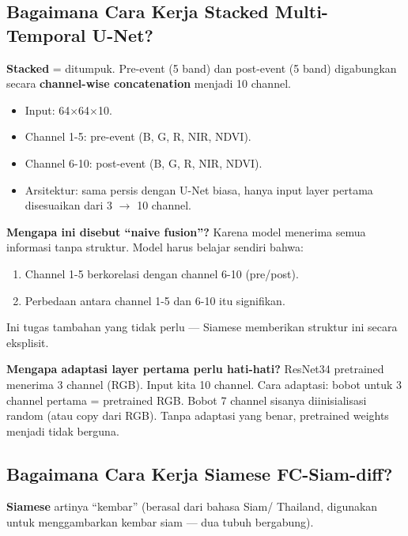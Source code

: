 \documentclass[10pt,a4paper,onecolumn]{article}
\begin{document}
\subsection{Bagaimana Cara Kerja Stacked Multi-Temporal U-Net?}

\textbf{Stacked} = ditumpuk. Pre-event (5 band) dan post-event
(5 band) digabungkan secara \textbf{channel-wise concatenation}
menjadi 10 channel.

\begin{itemize}[nosep]
    \item Input: 64$\times$64$\times$10.
    \item Channel 1-5: pre-event (B, G, R, NIR, NDVI).
    \item Channel 6-10: post-event (B, G, R, NIR, NDVI).
    \item Arsitektur: sama persis dengan U-Net biasa, hanya input
          layer pertama disesuaikan dari 3 $\rightarrow$ 10 channel.
\end{itemize}

\textbf{Mengapa ini disebut ``naive fusion''?} Karena model menerima
semua informasi tanpa struktur. Model harus belajar sendiri bahwa:
\begin{enumerate}[nosep]
    \item Channel 1-5 berkorelasi dengan channel 6-10 (pre/post).
    \item Perbedaan antara channel 1-5 dan 6-10 itu signifikan.
\end{enumerate}
Ini tugas tambahan yang tidak perlu — Siamese memberikan struktur
ini secara eksplisit.

\textbf{Mengapa adaptasi layer pertama perlu hati-hati?} ResNet34
pretrained menerima 3 channel (RGB). Input kita 10 channel. Cara
adaptasi: bobot untuk 3 channel pertama = pretrained RGB. Bobot 7
channel sisanya diinisialisasi random (atau copy dari RGB). Tanpa
adaptasi yang benar, pretrained weights menjadi tidak berguna.

\subsection{Bagaimana Cara Kerja Siamese FC-Siam-diff?}

\textbf{Siamese} artinya ``kembar'' (berasal dari bahasa Siam/
Thailand, digunakan untuk menggambarkan kembar siam — dua tubuh
bergabung).
\end{document}
